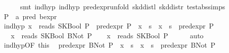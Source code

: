 \begin{isabellebody}
\ \ \ \ \isamarkupfalse%
\ {}smt\ ind{}hyp{}\ ind{}hyp{}\ pred{}expr{}unfold\ skd{}distl\ skd{}distr\ test{}abs{}simps{}{}{}{}\isanewline
{}\isamarkupfalse%
\isanewline
\ \ \isamarkupfalse%
\ P\ {}{}\ {}{}a\ pred\ bexpr{}\isanewline
\ \ \isamarkupfalse%
\ ind{}hyp{}\ {}x\ {}\ reads\ {}SKBool\ P{}\ {}\ pred{}expr\ P\ {}\ x\ {}{}\ s\ {}\ x\ {}{}\ s\ {}\ pred{}expr\ P{}\isanewline
\ \ \ {}x\ {}\ reads\ {}SKBool\ {}BNot\ P{}{}{}\isanewline
\ \ \isamarkupfalse%
\ {}x\ {}\ reads\ {}SKBool\ P{}{}\isanewline
\ \ \ \ \isamarkupfalse%
\ auto\isanewline
\ \ \isamarkupfalse%
\ ind{}hyp{}OF\ this{}\ \isamarkupfalse%
\ {}pred{}expr\ {}BNot\ P{}\ {}\ x\ {}{}\ s\ {}\ x\ {}{}\ s\ {}\ pred{}expr\ {}BNot\ P{}{}\isanewline

\end{isabellebody}
